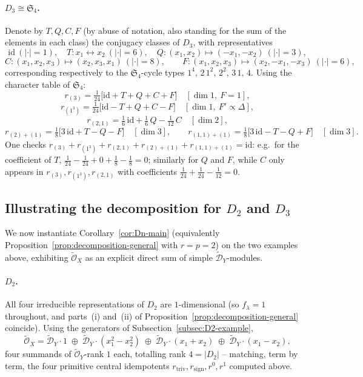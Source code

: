 \documentclass[11pt,a4paper]{article}
\begin{document}
\paragraph{$D_3 \cong \mathfrak{S}_4$.}
Denote by $T,Q,C,F$ (by abuse of notation, also standing for the sum
of the elements in each class) the conjugacy classes of $D_3$, with
representatives
\[
  \mathrm{id}\ (|{\cdot}|{=}1),\quad
  T: x_1\leftrightarrow x_2\ (|{\cdot}|{=}6),\quad
  Q: (x_1,x_2)\mapsto(-x_1,-x_2)\ (|{\cdot}|{=}3),
\]
\[
  C: (x_1,x_2,x_3)\mapsto(x_2,x_3,x_1)\ (|{\cdot}|{=}8),
  \qquad
  F: (x_1,x_2,x_3)\mapsto(x_2,-x_1,-x_3)\ (|{\cdot}|{=}6),
\]
corresponding respectively to the $\mathfrak{S}_4$-cycle types
$1^4,\,2\,1^2,\,2^2,\,3\,1,\,4$. Using the character table of
$\mathfrak{S}_4$:
\[
  r_{(3)} = \tfrac{1}{24}\big[\mathrm{id}+T+Q+C+F\big]
  \quad [\dim 1,\ F=1],
\]
\[
  r_{(1^3)} = \tfrac{1}{24}\big[\mathrm{id}-T+Q+C-F\big]
  \quad [\dim 1,\ F' \propto \Delta],
\]
\[
  r_{(2,1)} = \tfrac16\,\mathrm{id} + \tfrac16\, Q - \tfrac{1}{12}\, C
  \quad [\dim 2],
\]
\[
  r_{(2)+(1)} = \tfrac18\big[3\,\mathrm{id}+T-Q-F\big]
  \quad [\dim 3],
  \qquad
  r_{(1,1)+(1)} = \tfrac18\big[3\,\mathrm{id}-T-Q+F\big]
  \quad [\dim 3].
\]
One checks $r_{(3)}+r_{(1^3)}+r_{(2,1)}+r_{(2)+(1)}+r_{(1,1)+(1)}=\mathrm{id}$:
e.g.\ for the coefficient of $T$, $\tfrac1{24}-\tfrac1{24}+0+\tfrac18-\tfrac18=0$;
similarly for $Q$ and $F$, while $C$ only appears in $r_{(3)},r_{(1^3)},r_{(2,1)}$
with coefficients $\tfrac1{24}+\tfrac1{24}-\tfrac1{12}=0$.

\subsection{Illustrating the decomposition for $D_2$ and $D_3$}

We now instantiate Corollary~\ref{cor:Dn-main} (equivalently
Proposition~\ref{prop:decomposition-general} with $r=p=2$) on the two
examples above, exhibiting $\widetilde{\mathcal O}_X$ as an explicit
direct sum of simple $\widetilde{\mathcal D}_Y$-modules.

\paragraph{$D_2$.} All four irreducible representations of $D_2$ are
$1$-dimensional (so $f_\lambda=1$ throughout, and parts~(i) and~(ii)
of Proposition~\ref{prop:decomposition-general} coincide). Using the
generators of Subsection~\ref{subsec:D2-example},
\[
  \widetilde{\mathcal O}_X =
  \widetilde{\mathcal D}_Y\cdot 1 \;\oplus\;
  \widetilde{\mathcal D}_Y\cdot(x_1^2-x_2^2) \;\oplus\;
  \widetilde{\mathcal D}_Y\cdot(x_1+x_2) \;\oplus\;
  \widetilde{\mathcal D}_Y\cdot(x_1-x_2),
\]
four summands of $\widetilde{\mathcal O}_Y$-rank $1$ each, totalling
rank $4 = |D_2|$ -- matching, term by term, the four primitive central
idempotents $r_{\mathrm{triv}}, r_{\mathrm{sign}}, r^0, r^1$ computed
above.
\end{document}
